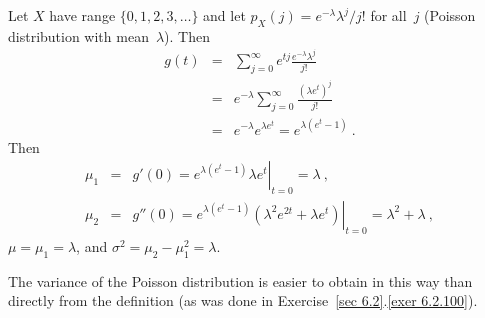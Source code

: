 \begin{example}\label{exam 10.4}
Let $X$ have range $\{0,1,2,3,\ldots\}$ and let $p_X(j) =
e^{-\lambda}\lambda^j/j!$ for all~$j$ (Poisson distribution with mean~$\lambda$). 
Then
\begin{eqnarray*}
g(t) &=& \sum_{j = 0}^\infty e^{tj} \frac {e^{-\lambda}\lambda^j}{j!} \\
     &=& e^{-\lambda} \sum_{j = 0}^\infty \frac {(\lambda e^t)^j}{j!} \\
     &=& e^{-\lambda} e^{\lambda e^t} = e^{\lambda(e^t - 1)}\ .
\end{eqnarray*}
Then
\begin{eqnarray*}
\mu_1 &=& g'(0) = \left. e^{\lambda(e^t - 1)}\lambda e^t \right|_{t = 0} = \lambda\ ,\\
\mu_2 &=& g''(0) = \left. e^{\lambda(e^t - 1)} (\lambda^2 e^{2t} + \lambda e^t)
\right|_{t = 0} = \lambda^2 + \lambda\ ,
\end{eqnarray*} 
$\mu = \mu_1 = \lambda$, and $\sigma^2 = \mu_2 - \mu_1^2 = \lambda$.
\par
The variance of the Poisson distribution is easier to obtain in this way than directly
from the definition (as was done in Exercise~\ref{sec 6.2}.\ref{exer 6.2.100}).
\end{example}

